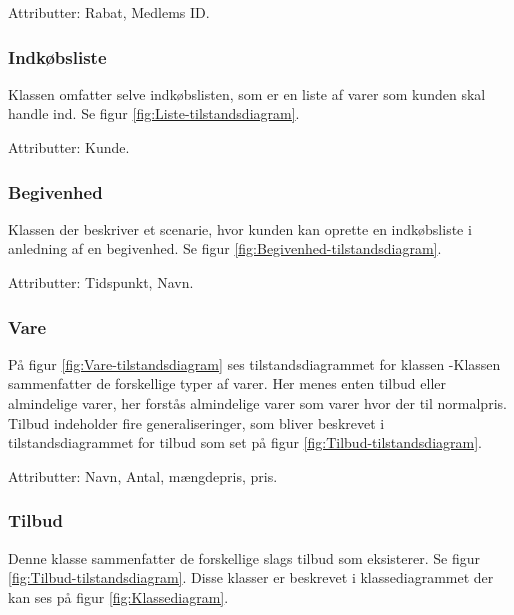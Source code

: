 Attributter: Rabat, Medlems ID.

\subsubsection{Indkøbsliste}
Klassen omfatter selve indkøbslisten, som er en liste af varer som kunden skal handle ind. Se figur \ref{fig:Liste-tilstandsdiagram}.

Attributter: Kunde.

\subsubsection{Begivenhed}
Klassen der beskriver et scenarie, hvor kunden kan oprette en indkøbsliste i anledning af en begivenhed. Se figur \ref{fig:Begivenhed-tilstandsdiagram}.

Attributter: Tidspunkt, Navn.

\subsubsection{Vare}
På figur \ref{fig:Vare-tilstandsdiagram} ses tilstandsdiagrammet for klassen -Klassen sammenfatter de forskellige typer af varer. Her menes enten tilbud eller almindelige varer, her forstås almindelige varer som varer hvor der til normalpris. Tilbud indeholder fire generaliseringer, som bliver beskrevet i tilstandsdiagrammet for tilbud som set på figur \ref{fig:Tilbud-tilstandsdiagram}.
 
Attributter: Navn, Antal, mængdepris, pris.

\subsubsection{Tilbud}
Denne klasse sammenfatter de forskellige slags tilbud som eksisterer. Se figur \ref{fig:Tilbud-tilstandsdiagram}. Disse klasser er beskrevet i klassediagrammet der kan ses på figur \ref{fig:Klassediagram}.

